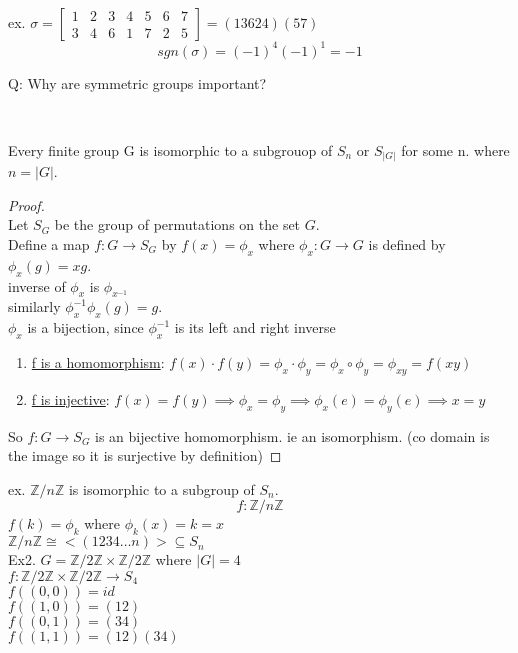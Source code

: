 \documentclass{article}
\begin{document}
ex. $\sigma =\begin{bmatrix}
    1 & 2 & 3 & 4 & 5 & 6 & 7\\
    3 & 4 & 6 & 1 & 7 & 2 & 5 
\end{bmatrix} = (1 3 6 2 4)(57)$ 
$$sgn(\sigma) = (-1)^4  (-1)^1 = -1 $$

Q: Why are symmetric groups important? \\ 
\begin{theorem} \leavevmode \\ 
\end{theorem}

Every finite group G is isomorphic to a subgrouop of $S_n$ or $S_{|G|}$ for some n. where $n = |G|$.
\begin{proof} \leavevmode \\ 
    Let $S_G$ be the group of permutations on the set $G$. \\ 
    Define a map $f: G \to S_G$ by $f(x) = \phi_x$ where $\phi_x: G \to G$ is defined by $\phi_x(g) = xg$. \\ inverse of $\phi_x$ is $\phi_{x^{-1}}$ 
    \\ similarly $\phi_x^{-1} \phi_x(g) = g$. \\ 
    $\phi_x$ is a bijection, since $\phi_x^{-1}$ is its left and right inverse 
    
    \begin{enumerate}
        \item \underline{f is a homomorphism}: $f(x) \cdot f(y) = \phi_x \cdot \phi_y = \phi_x \circ \phi_y = \phi_{xy} = f(xy)$
        \item \underline{f is injective}: $f(x) = f(y) \implies \phi_x = \phi_y \implies \phi_x(e) = \phi_y(e) \implies x = y$
    \end{enumerate}So $f: G \to S_G$ is an bijective homomorphism. ie an isomorphism. (co domain is the image so it is surjective by definition)
    
\end{proof}
ex. $\mathbb{Z} / n \mathbb{Z} $ is isomorphic to a subgroup of $S_n$. 
$$f: \mathbb{Z} / n \mathbb{Z}$$
$f(k) = \phi_k$ where $\phi_k(x) = k = x$ \\$\mathbb{Z}/ n \mathbb{Z} \cong <(1234\dots n) > \subseteq S_n$
\\ 
Ex2. $G= \mathbb{Z } / 2\mathbb{Z} \times \mathbb{Z } / 2\mathbb{Z}$ where $|G| = 4$ \\ 
$f: \mathbb{Z } / 2\mathbb{Z}\times \mathbb{Z } / 2\mathbb{Z} \to S_4$  \\ 
$f((0,0)) = id$ \\
$f((1,0)) = (12)$ \\
$f((0,1)) = (34)$ \\
$f((1,1)) = (12)(34)$ 
\end{document}
